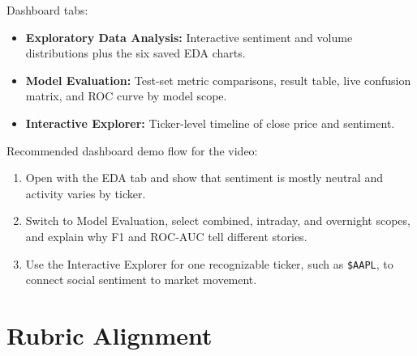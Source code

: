\documentclass[11pt]{article}
\begin{document}
Dashboard tabs:

\begin{itemize}
    \item \textbf{Exploratory Data Analysis:} Interactive sentiment and volume distributions plus the six saved EDA charts.
    \item \textbf{Model Evaluation:} Test-set metric comparisons, result table, live confusion matrix, and ROC curve by model scope.
    \item \textbf{Interactive Explorer:} Ticker-level timeline of close price and sentiment.
\end{itemize}

Recommended dashboard demo flow for the video:

\begin{enumerate}
    \item Open with the EDA tab and show that sentiment is mostly neutral and activity varies by ticker.
    \item Switch to Model Evaluation, select combined, intraday, and overnight scopes, and explain why F1 and ROC-AUC tell different stories.
    \item Use the Interactive Explorer for one recognizable ticker, such as \texttt{\$AAPL}, to connect social sentiment to market movement.
\end{enumerate}

\section{Rubric Alignment}
\end{document}
